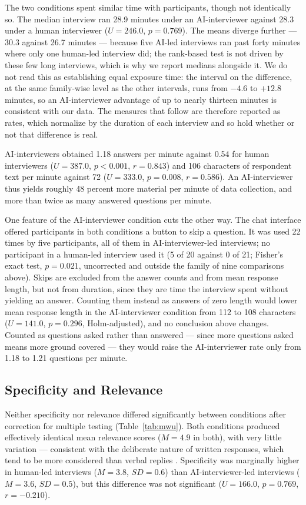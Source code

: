 \documentclass[12pt]{article}
\newcommand{\AII}{AI-interviewer}
\newcommand{\AIIs}{AI-interviewers}
\begin{document}
The two conditions spent similar time with participants, though not identically so. The median interview ran 28.9 minutes under an \AII{} against 28.3 under a human interviewer ($U = 246.0$, $p = 0.769$). The means diverge further --- 30.3 against 26.7 minutes --- because five AI-led interviews ran past forty minutes where only one human-led interview did; the rank-based test is not driven by these few long interviews, which is why we report medians alongside it. We do not read this as establishing equal exposure time: the interval on the difference, at the same family-wise level as the other intervals, runs from $-4.6$ to $+12.8$ minutes, so an \AII{} advantage of up to nearly thirteen minutes is consistent with our data. The measures that follow are therefore reported as rates, which normalize by the duration of each interview and so hold whether or not that difference is real.

\AIIs{} obtained 1.18 answers per minute against 0.54 for human interviewers ($U = 387.0$, $p < 0.001$, $r = 0.843$) and 106 characters of respondent text per minute against 72 ($U = 333.0$, $p = 0.008$, $r = 0.586$). An \AII{} thus yields roughly 48 percent more material per minute of data collection, and more than twice as many answered questions per minute.

One feature of the \AII{} condition cuts the other way. The chat interface offered participants in both conditions a button to skip a question. It was used 22 times by five participants, all of them in \AII{}-led interviews; no participant in a human-led interview used it (5 of 20 against 0 of 21; Fisher's exact test, $p = 0.021$, uncorrected and outside the family of nine comparisons above). Skips are excluded from the answer counts and from mean response length, but not from duration, since they are time the interview spent without yielding an answer. Counting them instead as answers of zero length would lower mean response length in the \AII{} condition from 112 to 108 characters ($U = 141.0$, $p = 0.296$, Holm-adjusted), and no conclusion above changes. Counted as questions asked rather than answered --- since more questions asked means more ground covered --- they would raise the \AII{} rate only from 1.18 to 1.21 questions per minute.

\subsection*{Specificity and Relevance}

Neither specificity nor relevance differed significantly between conditions after correction for multiple testing (Table~\ref{tab:mwu}). Both conditions produced effectively identical mean relevance scores ($M = 4.9$ in both), with very little variation --- consistent with the deliberate nature of written responses, which tend to be more considered than verbal replies \citep{HohneGavras2022}. Specificity was marginally higher in human-led interviews ($M = 3.8$, $SD = 0.6$) than \AII{}-led interviews ($M = 3.6$, $SD = 0.5$), but this difference was not significant ($U = 166.0$, $p = 0.769$, $r = -0.210$).
\end{document}
